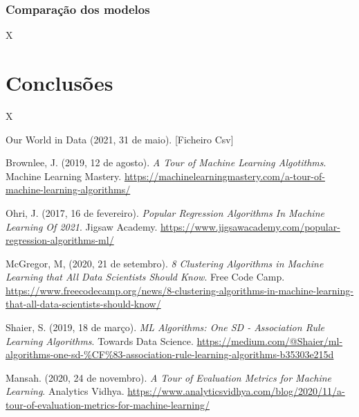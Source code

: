 \documentclass[conference]{IEEEtran}
\begin{document}
\subsubsection{Comparação dos modelos}
X



\section{Conclusões} %
X

\begin{thebibliography}{00}

 Our World in Data (2021, 31 de maio). [Ficheiro Csv]

 Brownlee, J. (2019, 12 de agosto). \textit{A Tour of Machine Learning Algotithms}. Machine Learning Mastery. \url{https://machinelearningmastery.com/a-tour-of-machine-learning-algorithms/}

 Ohri, J. (2017, 16 de fevereiro). \textit{Popular Regression Algorithms In Machine Learning Of 2021}. Jigsaw Academy. \url{https://www.jigsawacademy.com/popular-regression-algorithms-ml/}

 McGregor, M, (2020, 21 de setembro). \textit{8 Clustering Algorithms in Machine Learning that All Data Scientists Should Know}. Free Code Camp. \url{https://www.freecodecamp.org/news/8-clustering-algorithms-in-machine-learning-that-all-data-scientists-should-know/ }

 Shaier, S. (2019, 18 de março). \textit{ML Algorithms: One SD - Association Rule Learning Algorithms}. Towards Data Science. \url{https://medium.com/@Shaier/ml-algorithms-one-sd-%CF%83-association-rule-learning-algorithms-b35303e215d}

 Mansah. (2020, 24 de novembro). \textit{A Tour of Evaluation Metrics for Machine Learning}. Analytics Vidhya. \url{https://www.analyticsvidhya.com/blog/2020/11/a-tour-of-evaluation-metrics-for-machine-learning/}

\end{thebibliography}
\end{document}
